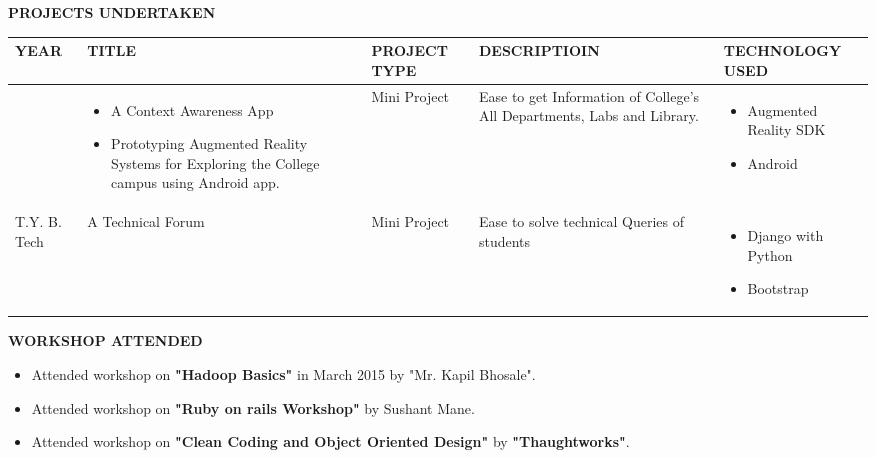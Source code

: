 \documentclass{article}
\begin{document}
\newpage
\begin{framed}
	\large{\textbf{PROJECTS UNDERTAKEN}}
\end{framed}
\setlength{\tabcolsep}{0.1em}
\def\arraystretch{1.7}
\begin{center}
\begin{tabularx}{\linewidth}{|X|X|X|X|X|}
	\hline
	\centering\textbf{YEAR} & \centering\textbf{ TITLE} & \centering\textbf{PROJECT TYPE} & \centering\textbf{DESCRIPTIOIN} & \textbf{TECHNOLOGY USED}\\
\hline

	\centering{ T.Y. B. Tech} & 
	\centering 
		\begin{itemize}
				\item A Context Awareness App
				\item Prototyping Augmented Reality Systems for Exploring the College campus using Android app.
		\end{itemize}
 	&
	\centering Mini Project&
	\centering Ease to get Information of College's All Departments, Labs and Library. 
	&
	\begin{itemize}
		\item Augmented Reality SDK
		\item Android
	\end{itemize}\\
	\hline
	
	\centering T.Y. B. Tech & 
	A Technical Forum  & Mini Project & Ease to solve technical Queries of students &
	\begin{itemize}	
		\item Django with Python
		\item Bootstrap
	\end{itemize} \\
	\hline
\end{tabularx}
\end{center}


\begin{framed}
	\large{\textbf{WORKSHOP ATTENDED}}
\end{framed}

\begin{itemize}
	\item Attended workshop on \textbf{"Hadoop Basics"} in March 2015 by "Mr. Kapil Bhosale".
	\item Attended workshop on \textbf{"Ruby on rails Workshop"} by Sushant Mane.
	\item Attended workshop on \textbf{"Clean Coding and Object Oriented Design"} by \textbf{"Thaughtworks"}. 
\end{itemize}
\end{document}
